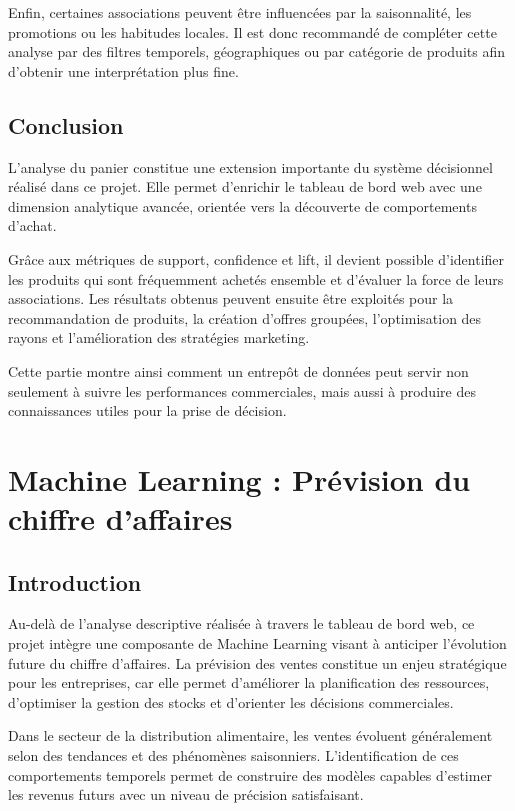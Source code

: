 \documentclass[12pt,a4paper,twoside]{report}
\begin{document}
Enfin, certaines associations peuvent être influencées par la saisonnalité, les promotions ou les habitudes locales. Il est donc recommandé de compléter cette analyse par des filtres temporels, géographiques ou par catégorie de produits afin d'obtenir une interprétation plus fine.

\section{Conclusion}

L'analyse du panier constitue une extension importante du système décisionnel réalisé dans ce projet. Elle permet d'enrichir le tableau de bord web avec une dimension analytique avancée, orientée vers la découverte de comportements d'achat.

Grâce aux métriques de support, confidence et lift, il devient possible d'identifier les produits qui sont fréquemment achetés ensemble et d'évaluer la force de leurs associations. Les résultats obtenus peuvent ensuite être exploités pour la recommandation de produits, la création d'offres groupées, l'optimisation des rayons et l'amélioration des stratégies marketing.

Cette partie montre ainsi comment un entrepôt de données peut servir non seulement à suivre les performances commerciales, mais aussi à produire des connaissances utiles pour la prise de décision.

\chapter{Machine Learning : Prévision du chiffre d'affaires}

\section{Introduction}

Au-delà de l'analyse descriptive réalisée à travers le tableau de bord web, ce projet intègre une composante de Machine Learning visant à anticiper l'évolution future du chiffre d'affaires. La prévision des ventes constitue un enjeu stratégique pour les entreprises, car elle permet d'améliorer la planification des ressources, d'optimiser la gestion des stocks et d'orienter les décisions commerciales.

Dans le secteur de la distribution alimentaire, les ventes évoluent généralement selon des tendances et des phénomènes saisonniers. L'identification de ces comportements temporels permet de construire des modèles capables d'estimer les revenus futurs avec un niveau de précision satisfaisant.
\end{document}
